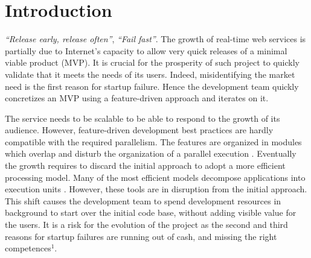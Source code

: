 \section{Introduction}

\textit{``Release early, release often''}, \textit{``Fail fast''}.
The growth of real-time web services is partially due to Internet's capacity to allow very quick releases of a minimal viable product (MVP).
It is crucial for the prosperity of such project to quickly validate that it meets the needs of its users.
Indeed, misidentifying the market need is the first reason for startup failure.
Hence the development team quickly concretizes an MVP using a feature-driven approach and iterates on it.

The service needs to be scalable to be able to respond to the growth of its audience.
However, feature-driven development best practices are hardly compatible with the required parallelism.
The features are organized in modules which overlap and disturb the organization of a parallel execution \cite{Clements2013a,Hughes1989,Parnas1972}.
Eventually the growth requires to discard the initial approach to adopt a more efficient processing model.
Many of the most efficient models decompose applications into execution units \cite{Fox1997, Welsh2000, Dean2008}.
However, these tools are in disruption from the initial approach.
This shift causes the development team to spend development resources in background to start over the initial code base, without adding visible value for the users.
It is a risk for the evolution of the project as the second and third reasons for startup failures are running out of cash, and missing the right competences$^1$.

